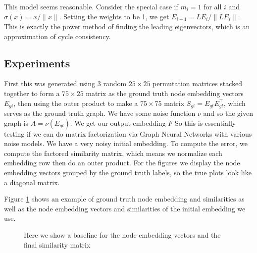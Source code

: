 \documentclass[a4paper]{article}
\begin{document}
This model seems reasonable. Consider the special case if $m_i = 1$ for all $i$ and $\sigma(x) = x / \|x\|$. Setting the weights to be 1, we get $E_{i+1} = L E_i / \| L E_i \|$. This is exactly the power method of finding the leading eigenvectors, which is an approximation of cycle consistency.

\subsection*{Experiments}
First this was generated using 3 random $25 \times 25$ permutation matrices stacked together to form a $75 \times 25$  matrix as the ground truth node embedding vectors $E_{gt}$, then using the outer product to make a $75 \times 75$ matrix $S_{gt} = E_{gt} E_{gt}^\top$, which serves as the ground truth graph. We have some noise function $\nu$ and so the given graph is $A = \nu(E_{gt})$. We get our output embedding $F$ So this is essentially testing if we can do matrix factorization via Graph Neural Networks with various noise models. We have a very noisy initial embedding. To compute the error, we compute the factored similarity matrix, which means we normalize each embedding row then do an outer product. For the figures we display the node embedding vectors grouped by the ground truth labels, so the true plots look like a diagonal matrix.

Figure \ref{fig:baseline_plot} shows an example of ground truth node embedding and similarities as well as the node embedding vectors and similarities of the initial embedding we use.

\begin{figure}[H]
    \centering
    \caption{Here we show a baseline for the node embedding vectors and the final similarity matrix}
    \label{fig:baseline_plot}
\end{figure}
\end{document}
